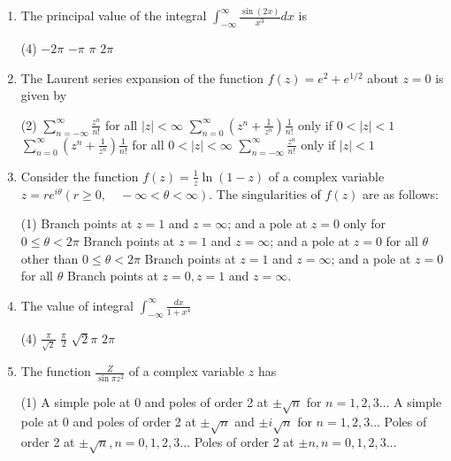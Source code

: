 \begin{enumerate}[label=\color{ocre}\textbf{\arabic*.}]
	\item The principal value of the integral $\int_{-\infty}^{\infty} \frac{\sin (2 x)}{x^{3}} d x$ is
	{}
	\begin{tasks}(4)
		\task[\textbf{A.}] $-2 \pi$
		\task[\textbf{B.}]  $-\pi$
		\task[\textbf{C.}] $\pi$
		\task[\textbf{D.}]  $2 \pi$
	\end{tasks}
	
	\item The Laurent series expansion of the function $f(z)=e^{2}+e^{1 / 2}$ about $z=0$ is given by
	{}
	\begin{tasks}(2)
		\task[\textbf{A.}] $\sum_{n=-\infty}^{\infty} \frac{z^{n}}{n !}$ for all $|z|<\infty$
		\task[\textbf{B.}] $\sum_{n=0}^{\infty}\left(z^{n}+\frac{1}{z^{n}}\right) \frac{1}{n !}$ only if $0<|z|<1$
		\task[\textbf{C.}] $\sum_{n=0}^{\infty}\left(z^{n}+\frac{1}{z^{n}}\right) \frac{1}{n !}$ for all $0<|z|<\infty$
		\task[\textbf{D.}]  $\sum_{n=-\infty}^{\infty} \frac{z^{n}}{n !}$ only if $|z|<1$
	\end{tasks}
	
	\item Consider the function $f(z)=\frac{1}{z} \ln (1-z)$ of a complex variable $z=r e^{i \theta}(r \geq 0, \quad-\infty<\theta<\infty)$. The singularities of $f(z)$ are as follows:
	{}
	\begin{tasks}(1)
		\task[\textbf{A.}]  Branch points at $z=1$ and $z=\infty$; and a pole at $z=0$ only for $0 \leq \theta<2 \pi$
		\task[\textbf{B.}] Branch points at $z=1$ and $z=\infty$; and a pole at $z=0$ for all $\theta$ other than $0 \leq \theta<2 \pi$
		\task[\textbf{C.}] Branch points at $z=1$ and $z=\infty$; and a pole at $z=0$ for all $\theta$
		\task[\textbf{D.}] Branch points at $z=0, z=1$ and $z=\infty$.
	\end{tasks}
	
	\item  The value of integral $\int_{-\infty}^{\infty} \frac{d x}{1+x^{4}}$
	{}
	\begin{tasks}(4)
		\task[\textbf{A.}] $\frac{\pi}{\sqrt{2}}$
		\task[\textbf{B.}] $\frac{\pi}{2}$
		\task[\textbf{C.}] $\sqrt{2} \pi$
		\task[\textbf{D.}] $2 \pi$
	\end{tasks}

	\item  The function $\frac{Z}{\sin \pi z^{2}}$ of a complex variable $z$ has
	{}
	\begin{tasks}(1)
		\task[\textbf{A.}] A simple pole at 0 and poles of order 2 at $\pm \sqrt{n}$ for $n=1,2,3 \ldots$
		\task[\textbf{B.}] A simple pole at 0 and poles of order 2 at $\pm \sqrt{n}$ and $\pm i \sqrt{n}$ for $n=1,2,3 \ldots$
		\task[\textbf{C.}] Poles of order 2 at $\pm \sqrt{n}, n=0,1,2,3 \ldots$
		\task[\textbf{D.}] Poles of order 2 at $\pm n, n=0,1,2,3 \ldots$
	\end{tasks}
	

\end{enumerate}
